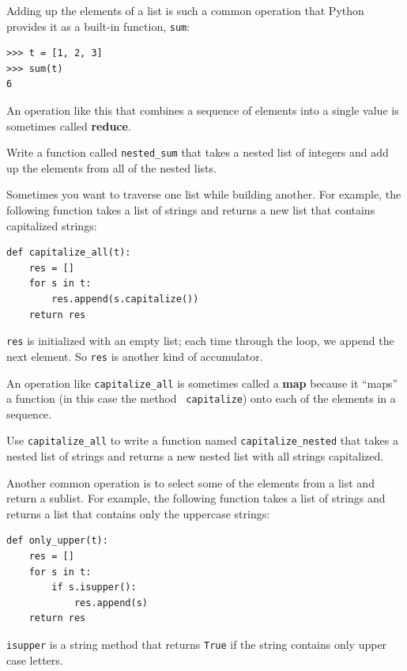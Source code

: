 \documentclass[10pt]{book}
\begin{document}
\begin{CJK}{UTF8}{gbsn}
Adding up the elements of a list is such a common operation
that Python provides it as a built-in function, {\tt sum}:

\begin{verbatim}
>>> t = [1, 2, 3]
>>> sum(t)
6
\end{verbatim}
%
An operation like this that combines a sequence of elements into
a single value is sometimes called {\bf reduce}.

\begin{exercise}

Write a function called \verb"nested_sum" that takes a nested list
of integers and add up the elements from all of the nested lists.

\end{exercise}

Sometimes you want to traverse one list while building
another.  For example, the following function takes a list of strings
and returns a new list that contains capitalized strings:

\begin{verbatim}
def capitalize_all(t):
    res = []
    for s in t:
        res.append(s.capitalize())
    return res
\end{verbatim}
%
{\tt res} is initialized with an empty list; each time through
the loop, we append the next element.  So {\tt res} is another
kind of accumulator.

An operation like \verb"capitalize_all" is sometimes called a {\bf
map} because it ``maps'' a function (in this case the method {\tt
capitalize}) onto each of the elements in a sequence.

\begin{exercise}

Use \verb"capitalize_all" to write a function named \verb"capitalize_nested"
that takes a nested list of strings and returns a new nested list
with all strings capitalized.

\end{exercise}

Another common operation is to select some of the elements from
a list and return a sublist.  For example, the following
function takes a list of strings and returns a list that contains
only the uppercase strings:

\begin{verbatim}
def only_upper(t):
    res = []
    for s in t:
        if s.isupper():
            res.append(s)
    return res
\end{verbatim}
%
{\tt isupper} is a string method that returns {\tt True} if
the string contains only upper case letters.


\end{CJK}
\end{document}
